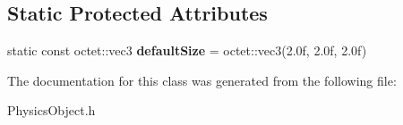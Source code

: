 \subsection*{Static Protected Attributes}
\begin{DoxyCompactItemize}
\item 
\hypertarget{class_arena_1_1_physics_object_a0b1e6536e2d403aff86c54c546772099}{static const octet\+::vec3 {\bfseries default\+Size} = octet\+::vec3(2.\+0f, 2.\+0f, 2.\+0f)}\label{class_arena_1_1_physics_object_a0b1e6536e2d403aff86c54c546772099}

\end{DoxyCompactItemize}


The documentation for this class was generated from the following file\+:\begin{DoxyCompactItemize}
\item 
Physics\+Object.\+h\end{DoxyCompactItemize}
